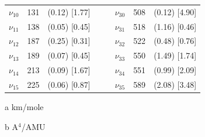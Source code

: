 \begin{table}[H]
\begin{center}
\begin{threeparttable}
\begin{tabular}{c c c c c c c c}
				$\nu_{10}$& 131 & (0.12)  [1.77] &  &    & $\nu_{30}$ & 508 & (0.12)  [4.90] \\ 
				$\nu_{11}$&  138 & (0.05)  [0.45] &  &    & $\nu_{31}$ & 518 & (1.16)  [0.46] \\ 
				$\nu_{12}$&  187 & (0.25)  [0.31] &  &    & $\nu_{32}$ & 522 & (0.48)  [0.76] \\ 
				$\nu_{13}$&  189 & (0.07)  [0.45] &  &    & $\nu_{33}$ & 550 & (1.49)  [1.74] \\ 
				$\nu_{14}$&  213 & (0.09)  [1.67] &  &    & $\nu_{34}$ & 551 & (0.99)  [2.09] \\ 
				$\nu_{15}$&  225 & (0.06)  [0.87] &  &    & $\nu_{35}$ & 589 & (2.08)  [3.48] \\ 
				\bottomrule
			\end{tabular}
			
			\begin{tablenotes}
				\item[a] km/mole
				\item[b] A$^{4}$/AMU
			\end{tablenotes}
		\end{threeparttable}
	\end{center}
	\label{lowfreq-18-dimethylflDi}
\end{table}			
		
		
		
		
		
		
	
	
